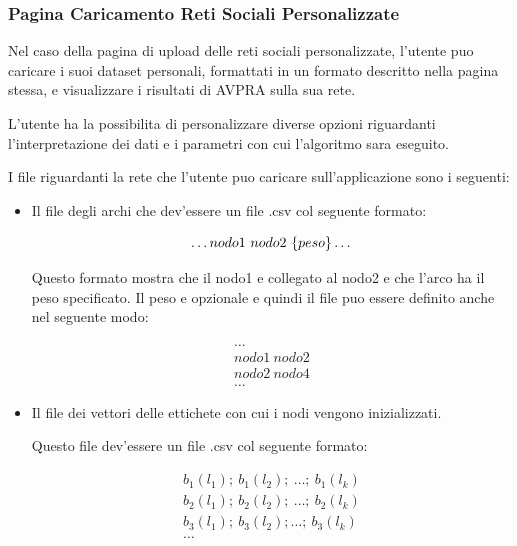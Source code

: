 \documentclass[a4paper,12pt]{report}
\begin{document}
			\subsubsection{Pagina Caricamento Reti Sociali Personalizzate}
			Nel caso della pagina di upload delle reti sociali personalizzate, l'utente puo caricare i suoi dataset personali, formattati in un formato descritto nella pagina stessa, e visualizzare i risultati di AVPRA sulla sua rete. 

			L'utente ha la possibilita di personalizzare diverse opzioni riguardanti l'interpretazione dei dati e i parametri con cui l'algoritmo sara eseguito. 

			I file riguardanti la rete che l'utente puo caricare sull'applicazione sono i seguenti:

			\begin{itemize}
				\item Il file degli archi che dev'essere un file .csv col seguente formato: 

				\begin{equation}
				\dots \\
				nodo1\ nodo2\ \{ peso \} \\
				\dots
				\end{equation}

				Questo formato mostra che il nodo1 e collegato al nodo2 e che l'arco ha il peso specificato. Il peso e opzionale e quindi il file puo essere definito anche nel seguente modo: 

				\begin{equation}
				\begin{aligned}
				\dots \\
				nodo1\  nodo2 \\
				nodo2\  nodo4 \\
				\dots
				\end{aligned}
				\end{equation}				

				\item Il file dei vettori delle ettichete con cui i nodi vengono inizializzati. 

				Questo file dev'essere un file .csv col seguente formato: 

				\begin{equation}
				\begin{aligned}
				b_1(l_1);\ b_1(l_2);\ \dots;\ b_1(l_k) \\
				b_2(l_1);\ b_2(l_2);\ \dots;\ b_2(l_k) \\
				b_3(l_1);\ b_3(l_2); \dots;\ b_3(l_k) \\
				\dots
				\end{aligned}
				\end{equation}
				

\end{itemize}
\end{document}

